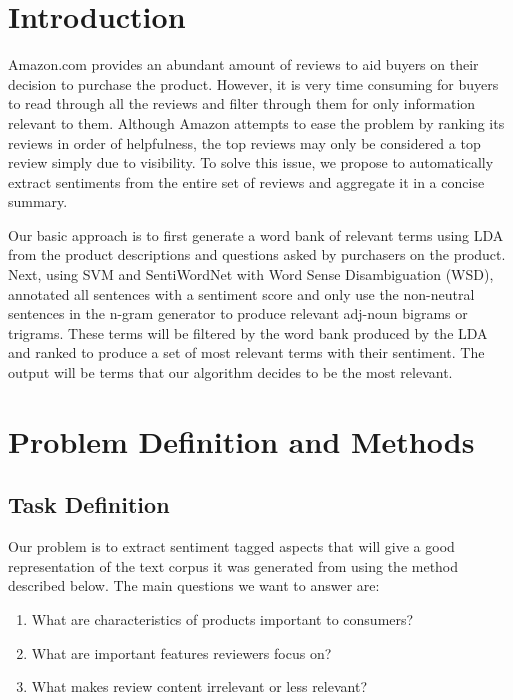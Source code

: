 \documentclass{article}
\begin{document}
 


\section{Introduction}
Amazon.com provides an abundant amount of reviews to aid buyers on their decision to purchase the product. However, it is very time consuming for buyers to read through all the reviews and filter through them for only information relevant to them. Although Amazon attempts
to ease the problem by ranking its reviews in order of helpfulness, the top reviews may only be considered a top review simply due to visibility. To solve this issue, we propose to automatically extract sentiments from the entire set of reviews and aggregate it in a concise summary.

Our basic approach is to first generate a word bank of relevant terms using LDA from the product descriptions and questions asked by purchasers on the product. Next, using SVM and SentiWordNet with Word Sense Disambiguation (WSD), annotated all sentences with a sentiment score and only use the non-neutral sentences in the n-gram generator to produce relevant adj-noun bigrams or trigrams. These terms will be filtered by the word bank produced by the LDA and ranked to produce a set of most relevant terms with their sentiment. The output will be terms that our algorithm decides to be the most relevant. 


\section{Problem Definition and Methods} 
 \subsection{Task Definition}
Our problem is to extract sentiment tagged aspects that will give a good representation of the text corpus it was generated from using the method described below. The main questions we want to answer are:
\begin{enumerate}
\item What are characteristics of products important to consumers?
\item What are important features reviewers focus on?
\item What makes review content irrelevant or less relevant?
\end{enumerate}
\end{document}
